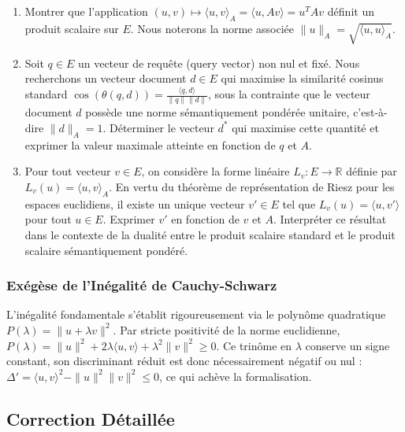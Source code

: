 \documentclass[11pt,a4paper]{report}
\begin{document}
\begin{enumerate}
\def\labelenumi{\arabic{enumi}.}
\item
  Montrer que l'application
  \((u, v) \mapsto \langle u, v \rangle_A = \langle u, Av \rangle = u^T A v\)
  définit un produit scalaire sur \(E\). Nous noterons la norme associée
  \(\|u\|_A = \sqrt{\langle u, u \rangle_A}\).
\item
  Soit \(q \in E\) un vecteur de requête (query vector) non nul et fixé.
  Nous recherchons un vecteur document \(d \in E\) qui maximise la
  similarité cosinus standard
  \(\cos(\theta(q,d)) = \frac{\langle q, d \rangle}{\|q\| \|d\|}\), sous
  la contrainte que le vecteur document \(d\) possède une norme
  sémantiquement pondérée unitaire, c'est-à-dire \(\|d\|_A = 1\).
  Déterminer le vecteur \(d^*\) qui maximise cette quantité et exprimer
  la valeur maximale atteinte en fonction de \(q\) et \(A\).
\item
  Pour tout vecteur \(v \in E\), on considère la forme linéaire
  \(L_v: E \to \mathbb{R}\) définie par
  \(L_v(u) = \langle u, v \rangle_A\). En vertu du théorème de
  représentation de Riesz pour les espaces euclidiens, il existe un
  unique vecteur \(v' \in E\) tel que \(L_v(u) = \langle u, v' \rangle\)
  pour tout \(u \in E\). Exprimer \(v'\) en fonction de \(v\) et \(A\).
  Interpréter ce résultat dans le contexte de la dualité entre le
  produit scalaire standard et le produit scalaire sémantiquement
  pondéré.
\end{enumerate}

\hypertarget{exuxe9guxe8se-de-linuxe9galituxe9-de-cauchy-schwarz}{%
\subsubsection{Exégèse de l'Inégalité de
Cauchy-Schwarz}\label{exuxe9guxe8se-de-linuxe9galituxe9-de-cauchy-schwarz}}

L'inégalité fondamentale s'établit rigoureusement via le polynôme
quadratique \(P(\lambda) = \|u + \lambda v\|^2\). Par stricte positivité
de la norme euclidienne,
\(P(\lambda) = \|u\|^2 + 2\lambda \langle u, v \rangle + \lambda^2 \|v\|^2 \ge 0\).
Ce trinôme en \(\lambda\) conserve un signe constant, son discriminant
réduit est donc nécessairement négatif ou nul :
\(\Delta' = \langle u, v \rangle^2 - \|u\|^2 \|v\|^2 \le 0\), ce qui
achève la formalisation.

\hypertarget{correction-duxe9tailluxe9e}{%
\subsection{Correction Détaillée}\label{correction-duxe9tailluxe9e}}
\end{document}
